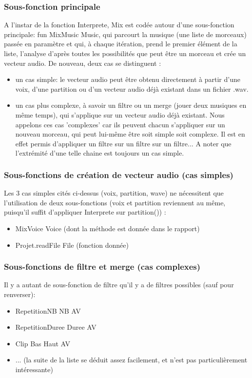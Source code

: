 \documentclass[12pt,a4paper]{article}
\begin{document}
\subsubsection{Sous-fonction principale}
A l'instar de la fonction Interprete, Mix est codée autour d'une sous-fonction principale: 
fun {MixMusic Music}, qui parcourt la musique (une liste de morceaux) passée en paramètre 
et qui, à chaque itération, prend le premier élément de la liste, l'analyse d'après toutes
 les possibilités que peut être un morceau et crée un vecteur audio. 
De nouveau, deux cas se distinguent :
\begin{itemize}
	\item un cas simple: le vecteur audio peut être obtenu directement à partir d'une voix, 
				d'une partition ou d'un vecteur audio déjà existant dans un fichier .wav.
	\item un cas plus complexe, à savoir un filtre ou un merge (jouer deux musiques en même temps),
				qui s'applique sur un vecteur audio déjà existant. Nous appelons ces cas 'complexes' car ils 
				peuvent chacun s'appliquer sur un nouveau morceau, qui peut lui-même être soit simple soit complexe.
				Il est en effet permis d'appliquer un filtre sur un filtre sur un filtre... A noter que l'extrémité 
				d'une telle chaine est toujours un cas simple.
\end{itemize}

\subsubsection{Sous-fonctions de création de vecteur audio (cas simples)}
Les 3 cas simples cités ci-dessus (voix, partition, wave)  ne nécessitent que l'utilisation
de deux sous-fonctions (voix et partition reviennent au même, puisqu'il suffit d'appliquer Interprete sur partition()) :
\begin{itemize}
	\item {MixVoice Voice} (dont la méthode est donnée dans le rapport)
	\item {Projet.readFile File} (fonction donnée)
\end{itemize}

\subsubsection{Sous-fonctions de filtre et merge (cas complexes)}
Il y a autant de sous-fonction de filtre qu'il y a de filtres possibles (sauf pour renverser):
\begin{itemize}
	\item  {RepetitionNB NB AV}
	\item {RepetitionDuree Duree AV}
	\item {Clip Bas Haut AV}
	\item ... (la suite de la liste se déduit assez facilement, et n'est pas particulièrement intéressante)
\end{itemize}
\end{document}
